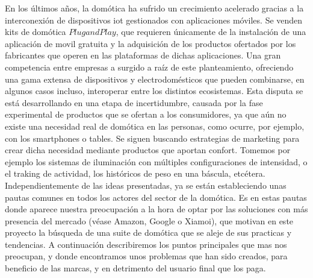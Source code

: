 En los últimos años, la domótica ha sufrido un crecimiento acelerado gracias a la interconexión de dispositivos \gls{iot} gestionados con aplicaciones móviles. Se venden kits de domótica $Plug and Play$, que requieren únicamente de la instalación de una aplicación de movil gratuita y la adquisición de los productos ofertados por los fabricantes que operen en las plataformas de dichas aplicaciones. Una gran competencia entre empresas a surgido a raíz de este planteamiento, ofreciendo una gama extensa de dispositivos y electrodomésticos que pueden combinarse, en algunos casos incluso, interoperar entre los distintos ecosistemas. Esta disputa se está desarrollando en una etapa de incertidumbre, causada por la fase experimental de productos que se ofertan a los consumidores, ya que aún no existe una necesidad real de domótica en las personas, como ocurre, por ejemplo, con los smartphones o tables. Se siguen buscando estrategias de marketing para crear dicha necesidad mediante productos que aportan confort. Tomemos por ejemplo los sistemas de iluminación con múltiples configuraciones de intensidad, o el traking de actividad, los históricos de peso en una báscula, etcétera. Independientemente de las ideas presentadas, ya se están estableciendo unas pautas comunes en todos los actores del sector de la domótica. Es en estas pautas donde aparece nuestra preocupación a la hora de optar por las soluciones con más presencia del mercado (véase Amazon, Google o Xiamoi), que motivan en este proyecto la búsqueda de una suite de domótica que se aleje de sus practicas y tendencias. A continuación describiremos los puntos principales que mas nos preocupan, y donde encontramos unos problemas que han sido creados, para beneficio de las marcas, y en detrimento del usuario final que los paga.

\vspace{1cm}

